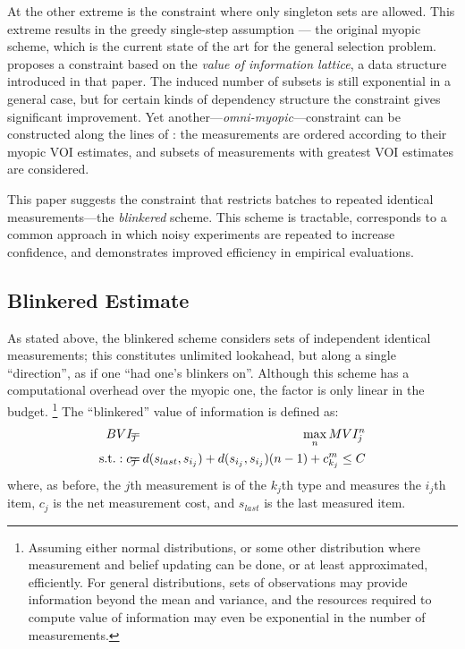 At the other extreme is the constraint where only singleton
sets are allowed. This extreme results in the greedy single-step
assumption --- the original myopic scheme, which is the
current state of the art for the general selection problem.
\cite{BilgicGetoor.voila} proposes a constraint based 
on the {\em value of information lattice},
a data structure introduced in that paper. The induced number of
subsets is still exponential in a general case, but for certain kinds
of dependency structure the constraint gives significant
improvement. Yet another---{\em omni-myopic}---constraint can be
constructed along the lines of \cite{Heckerman.nonmyopic}: the
measurements are ordered according to their myopic VOI estimates, and
subsets of measurements with greatest VOI estimates are considered.

This paper suggests the constraint that restricts batches to
repeated identical measurements---the {\em blinkered} scheme. This
scheme is tractable, corresponds to a common approach in which noisy
experiments are repeated to increase confidence, and demonstrates
improved efficiency in empirical evaluations.

\subsection{Blinkered Estimate}
\label{sec:thr-blinkered-estimate}

As stated above, the blinkered scheme considers sets of independent identical
measurements; this constitutes unlimited lookahead, but along a single
``direction'', as if one ``had one's blinkers on''.  Although this
scheme has a computational overhead over the myopic one, the factor is
only linear in the budget. \footnote{Assuming either
  normal distributions, or some other distribution 
  where measurement and belief updating can be done, or at least
  approximated, efficiently.
  For general distributions, sets of observations may
  provide information beyond the mean and variance, and the resources
  required to compute value of information may even be exponential in
  the number of measurements.}  The ``blinkered'' value of information
is defined as:
\begin{eqnarray}
\label{eq:thr-bvi}
BVI_j\hspace{-0.8em}&=&\hspace{-0.8em}\max_n MVI_j^n\\
\mathrm{s.t.:\;}c_j\hspace{-0.8em}&=&\hspace{-0.8em}d(s_{last}, s_{i_j})+d(s_{i_j}, s_{i_j})(n-1)+c^m_{k_j}\leq C\nonumber
\end{eqnarray} 
where, as before, the $j$th measurement is of the $k_j$th type and
measures the $i_j$th item, $c_j$ is the net measurement cost, and
$s_{last}$ is the last measured item. 

